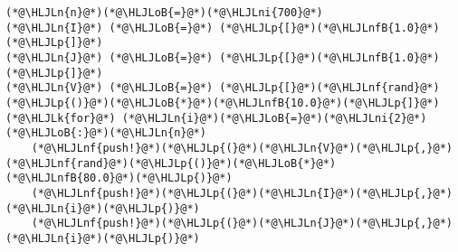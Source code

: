 \documentclass[12pt,a4paper]{article}
\newcommand{\HLJLk}[1]{\textcolor[RGB]{148,91,176}{\textbf{#1}}}
\newcommand{\HLJLn}[1]{#1}
\newcommand{\HLJLnf}[1]{\textcolor[RGB]{66,102,213}{#1}}
\newcommand{\HLJLnfB}[1]{\textcolor[RGB]{59,151,46}{#1}}
\newcommand{\HLJLni}[1]{\textcolor[RGB]{59,151,46}{#1}}
\newcommand{\HLJLoB}[1]{\textcolor[RGB]{102,102,102}{\textbf{#1}}}
\newcommand{\HLJLp}[1]{#1}
\begin{document}
\begin{lstlisting}
(*@\HLJLn{n}@*)(*@\HLJLoB{=}@*)(*@\HLJLni{700}@*)
(*@\HLJLn{I}@*) (*@\HLJLoB{=}@*) (*@\HLJLp{[}@*)(*@\HLJLnfB{1.0}@*)(*@\HLJLp{]}@*)
(*@\HLJLn{J}@*) (*@\HLJLoB{=}@*) (*@\HLJLp{[}@*)(*@\HLJLnfB{1.0}@*)(*@\HLJLp{]}@*)
(*@\HLJLn{V}@*) (*@\HLJLoB{=}@*) (*@\HLJLp{[}@*)(*@\HLJLnf{rand}@*)(*@\HLJLp{()}@*)(*@\HLJLoB{*}@*)(*@\HLJLnfB{10.0}@*)(*@\HLJLp{]}@*)
(*@\HLJLk{for}@*) (*@\HLJLn{i}@*)(*@\HLJLoB{=}@*)(*@\HLJLni{2}@*)(*@\HLJLoB{:}@*)(*@\HLJLn{n}@*)
    (*@\HLJLnf{push!}@*)(*@\HLJLp{(}@*)(*@\HLJLn{V}@*)(*@\HLJLp{,}@*) (*@\HLJLnf{rand}@*)(*@\HLJLp{()}@*)(*@\HLJLoB{*}@*)(*@\HLJLnfB{80.0}@*)(*@\HLJLp{)}@*)
    (*@\HLJLnf{push!}@*)(*@\HLJLp{(}@*)(*@\HLJLn{I}@*)(*@\HLJLp{,}@*) (*@\HLJLn{i}@*)(*@\HLJLp{)}@*)
    (*@\HLJLnf{push!}@*)(*@\HLJLp{(}@*)(*@\HLJLn{J}@*)(*@\HLJLp{,}@*) (*@\HLJLn{i}@*)(*@\HLJLp{)}@*)


\end{lstlisting}
\end{document}

